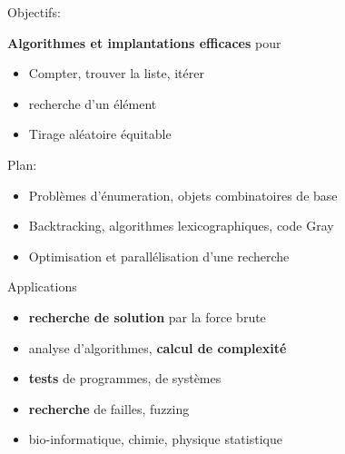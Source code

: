\documentclass[12pt]{beamer}
\begin{document}
\begin{frame}{Objectifs:}

  \begin{tcolorbox}
    \textbf{Algorithmes et implantations efficaces} pour
    \begin{itemize}
    \item Compter, trouver la liste, itérer
    \medskip
    \item recherche d'un élément
    \medskip
    \item Tirage aléatoire équitable
    \end{itemize}
  \end{tcolorbox}
  \bigskip\pause

  Plan:
  \begin{itemize}
  \item Problèmes d'énumeration, objets combinatoires de base
    \medskip

  \item Backtracking, algorithmes lexicographiques, code Gray
    \medskip

  \item Optimisation et parallélisation d'une recherche
  \end{itemize}
\end{frame}


\begin{frame}{Applications}

  \begin{itemize}
  \item \textbf{recherche de solution} par la force brute
    \bigskip

  \item analyse d'algorithmes, \textbf{calcul de complexité}
    \bigskip

  \item \textbf{tests} de programmes, de systèmes
    \bigskip

  \item \textbf{recherche} de failles, fuzzing
    \bigskip

  \item bio-informatique, chimie, physique statistique
  \end{itemize}
\end{frame}
\end{document}
